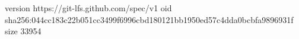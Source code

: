 version https://git-lfs.github.com/spec/v1
oid sha256:044cc183c22b051cc3499f6996cbd180121bb1950ed57c4dda0bcbfa9896931f
size 33954
